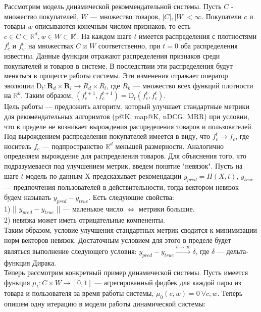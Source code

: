 \documentclass{article}
\begin{document}
Рассмотрим модель динамической рекоммендательной системы. Пусть $C$ - множество покупателей, $W$ --- множество товаров, $|C|, |W| < \infty$. Покупатели $c$ и товары $w$ описываются конечным числом признаков, то есть $ c \in C \subset \mathbb{R}^d, w \in W \subset \mathbb{R}^l$. На каждом шаге $t$ имеется распределения с плотностями $f_c^t$ и $f_w^t$ на множествах $C$ и $W$ соответственно, при $t = 0$ оба распределения известны. Данные функции отражают распределения признаков среди покупателей и товаров в системе. В последствии эти распределения будут меняться в процессе работы системы. Эти изменения отражает оператор эволюции $\text{D}_t : \textbf{R}_d \times \textbf{R}_l \rightarrow R_d \times R_l $, где $R_k$ --- множество всех функций плотности на $\mathbb{R}^k$. Таким образом, $(f_c^{t + 1}, f_c^{t+1}) = \text{D}_t(f_c^{t}, f_c^{t})$.\\
Цель работы --- предложить алгоритм, который улучшает стандартные метрики для рекомендательных алгоримтов (p@K, map@K, nDCG, MRR) при условии, что в пределе не возникает вырождения распределения товаров и пользователей. Под вырождением распределения покупателей имеется в виду, что $ f_c^t \rightarrow f_c $, где носитель $ f_c $ --- подпространство $ \mathbb{R}^d $ меньшей размерности. Аналогично определяем вырождение для распределения товаров. Для объяснения того, что подразумеваеся под улучшением метрик, введем понятие "невязок". Пусть на шаге $t$ модель по данным X предсказывает рекомендации $y_{pred} = H(X, t)$, $y_{true}$ --- предпочтения пользователей в действительности, тогда вектором невязок будем называть $y_{pred} - y_{true}$. Есть следующие свойства: \\
1) || $y_{pred} - y_{true}$ || --- маленькое число $\Leftrightarrow$ метрики большие.\\
2) невязка может иметь отрицательные компененты. \\
Таким образом, условие улучшения стандартных метрик сводится к минимизации норм векторов невязок. Достаточным условием для этого в пределе будет являться выполнение следующего условия: $y_{pred} - y_{true} \xrightarrow{t \rightarrow \infty } \delta$, где $\delta$ --- дельта-функция Дирака. \\
Теперь рассмотрим конкретный пример динамической системы. Пусть имеется функция $\mu_t: C \times W \rightarrow [0, 1] $ --- агрегированный фидбек для каждой пары из товара и пользователя за время работы системы, $\mu_0(c, w) = 0\ \forall c, w$. Теперь опишем одну итерацию в модели работы динамической системы:
\end{document}

